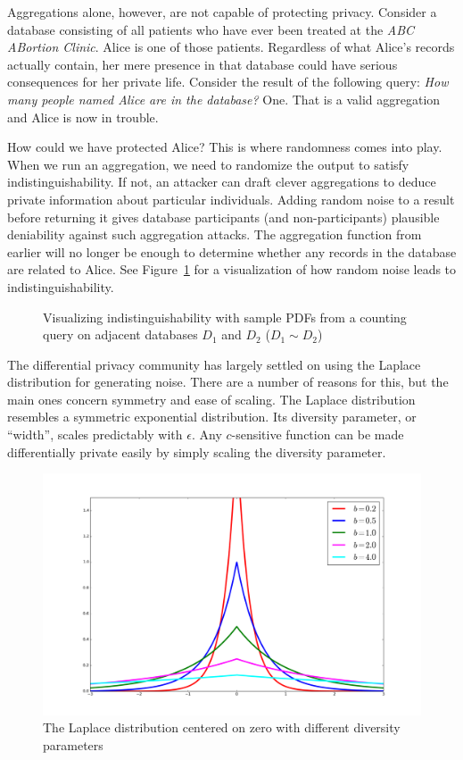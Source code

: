 \documentclass[12pt]{report}
\begin{document}
Aggregations alone, however, are not capable of protecting privacy.
Consider a database consisting of all patients who have ever been treated at the \textit{ABC ABortion Clinic}.
Alice is one of those patients.
Regardless of what Alice's records actually contain, her mere presence in that database could have serious consequences for her private life.
Consider the result of the following query: \textit{How many people named Alice are in the database?}
One.
That is a valid aggregation and Alice is now in trouble.

How could we have protected Alice?
This is where randomness comes into play.
When we run an aggregation, we need to randomize the output to satisfy indistinguishability.
If not, an attacker can draft clever aggregations to deduce private information about particular individuals.
Adding random noise to a result before returning it gives database participants (and non-participants) plausible deniability against such aggregation attacks.
The aggregation function from earlier will no longer be enough to determine whether any records in the database are related to Alice.
See Figure~\ref{fig:indistinguishability} for a visualization of how random noise leads to indistinguishability.

\begin{figure}
    \centering
    \def\svgwidth{0.75\linewidth}
    
    \caption{Visualizing indistinguishability with sample PDFs from a counting query on adjacent databases $D_1$ and $D_2$ ($D_1\sim D_2$)}
    \label{fig:indistinguishability}
\end{figure}

The differential privacy community has largely settled on using the Laplace distribution for generating noise.
There are a number of reasons for this, but the main ones concern symmetry and ease of scaling.
The Laplace distribution resembles a symmetric exponential distribution.
Its diversity parameter, or ``width'', scales predictably with $\epsilon$.
Any $c$-sensitive function can be made differentially private easily by simply scaling the diversity parameter.

\begin{figure}
    \centering
    \includegraphics[width=0.75\linewidth]{assets/laplace_b.png}
    \caption{The Laplace distribution centered on zero with different diversity parameters}
    \label{fig:fn_sens}
\end{figure}
\end{document}
